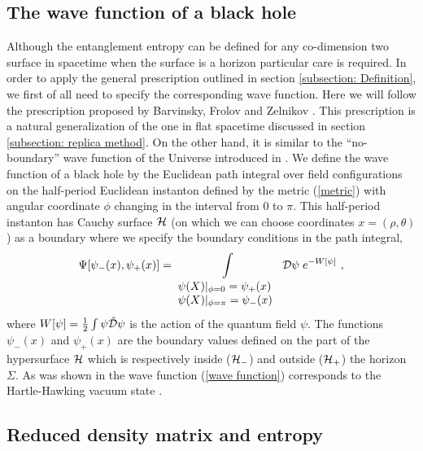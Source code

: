 \documentclass[12pt]{article}
\def\lb{\label}
\def\o{\over}
\begin{document}
\subsection{The wave function of a black hole}
Although the entanglement entropy can be defined for any co-dimension two surface in  spacetime 
when the surface is a horizon particular care is required.
 In order to apply the general prescription outlined in section \ref{subsection: Definition}, we first of all need to specify the corresponding wave function. Here we will follow the prescription proposed by Barvinsky, Frolov and Zelnikov \cite{Barvinsky:1994jca}. This prescription is a natural generalization of the one in flat spacetime discussed in section \ref{subsection: replica method}. On the other hand, it is similar to the ``no-boundary'' wave function of the Universe introduced in \cite{Hartle:1983ai}. We define the wave function of a black hole by the Euclidean path integral over field configurations on the half-period Euclidean instanton defined by the metric (\ref{metric}) with angular coordinate $\phi$ changing in the interval from $0$ to $\pi$. This half-period instanton has Cauchy surface $\cal H$ (on which we can choose  coordinates $x=(\rho,\theta)$) as a boundary where we specify the boundary conditions in the path integral,
\begin{equation}
  \Psi[\psi_-(x),\psi_+(x)]=\int\limits_{\begin{array}{ll}
                                          \psi(X)|_{\phi=0}=\psi_+(x)\\
                                           \psi(X)|_{\phi=\pi}=\psi_-(x)
                                           \end{array} }
   {\cal D}\psi\; e^{-W[\psi]}~,
  \lb{wave function}
  \end{equation}
where $W[\psi]={1\o 2}\int \psi {\hat{\cal D}}\psi$ is the action
of the quantum  field $\psi$.  The functions $\psi_-(x)$ and $\psi_+(x)$ are the boundary values defined on the  part of  the hypersurface $\cal H$ which is respectively inside (${\cal H}_-$) and  outside (${\cal H}_+$) the  horizon $\Sigma$.  As was shown in  \cite{Barvinsky:1994jca} the wave function (\ref{wave function}) corresponds to the Hartle-Hawking vacuum state \cite{Hartle:1976tp}.



\subsection{Reduced density  matrix and entropy}
\end{document}
